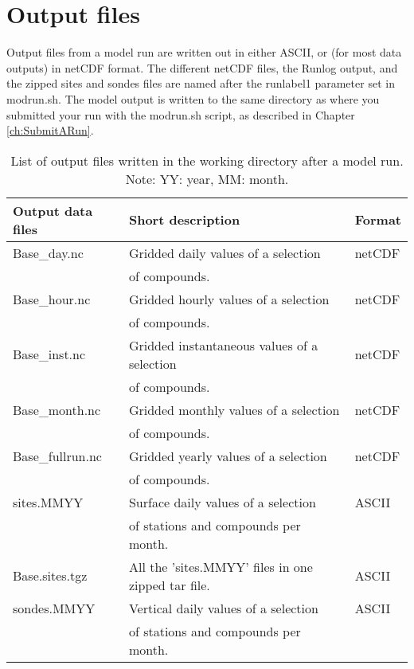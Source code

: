 \chapter{Output files}
\label{ch:output}

Output files from a model run are written out in either ASCII, or
(for most data outputs) in netCDF format. 
The different netCDF files, the Runlog output, and the zipped sites and sondes 
files are named after the runlabel1 parameter set in modrun.sh. 
The model output is written to the same directory as where you submitted 
your run with the modrun.sh script, as described in Chapter \ref{ch:SubmitARun}.
 


\begin{table}[h!]
\caption[List of model output files]{List of output files written in the
  working directory after a  model run. 
Note: YY: year, MM: month.}\label{tab:output}
\begin{center}
\hspace{-1cm}
\begin{tabular}{lll}
\hline
{\bf Output data files} &  {\bf Short description} & {\bf Format}\\
\hline
    Base\_day.nc & Gridded daily values of a selection & netCDF\\
&   of compounds.& \\ 
    Base\_hour.nc &Gridded hourly values of a selection &
    netCDF\\  
 &  of compounds.& \\
    Base\_inst.nc &Gridded instantaneous values of a selection
     & netCDF\\
 &  of compounds.& \\
    Base\_month.nc & Gridded monthly values of a selection&
    netCDF\\
 &  of compounds.& \\
    Base\_fullrun.nc & Gridded yearly values of a selection&
    netCDF\\
 &  of compounds. & \\
    sites.MMYY & Surface daily values of a selection&  ASCII\\
 & of stations and compounds per month.& \\
    Base.sites.tgz & All the 'sites.MMYY' files in one zipped tar file. & ASCII\\
    sondes.MMYY & Vertical daily values of a selection& ASCII\\
 &  of stations and compounds per month.& \\

\end{tabular}
\end{center}
\end{table}
